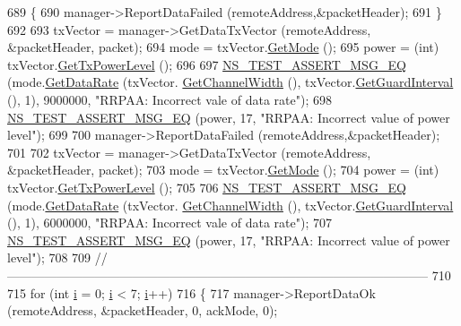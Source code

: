 \begin{DoxyCode}
689     \{
690       manager->ReportDataFailed (remoteAddress,&packetHeader);
691     \}
692 
693   txVector = manager->GetDataTxVector (remoteAddress, &packetHeader, packet);
694   mode = txVector.\hyperlink{classns3_1_1WifiTxVector_a497b1f11cad4b8b26251dfa07c9ad1d6}{GetMode} ();
695   power = (int) txVector.\hyperlink{classns3_1_1WifiTxVector_a7c98bd9609ff1c5cefa6e22d6908a2fe}{GetTxPowerLevel} ();
696 
697   \hyperlink{group__testing_ga2a9d78cffb3db8e867c35fff0b698cf5}{NS\_TEST\_ASSERT\_MSG\_EQ} (mode.\hyperlink{classns3_1_1WifiMode_adcfbe150f69da720db23387f733b8a52}{GetDataRate} (txVector.
      \hyperlink{classns3_1_1WifiTxVector_a1f8bfa51778a3e217581eb665f059564}{GetChannelWidth} (), txVector.\hyperlink{classns3_1_1WifiTxVector_ab80c0fd812542ef337a6cace4f64db63}{GetGuardInterval} (), 1), 9000000, \textcolor{stringliteral}{"RRPAA:
       Incorrect vale of data rate"});
698   \hyperlink{group__testing_ga2a9d78cffb3db8e867c35fff0b698cf5}{NS\_TEST\_ASSERT\_MSG\_EQ} (power, 17, \textcolor{stringliteral}{"RRPAA: Incorrect value of power level"});
699 
700   manager->ReportDataFailed (remoteAddress,&packetHeader);
701 
702   txVector = manager->GetDataTxVector (remoteAddress, &packetHeader, packet);
703   mode = txVector.\hyperlink{classns3_1_1WifiTxVector_a497b1f11cad4b8b26251dfa07c9ad1d6}{GetMode} ();
704   power = (int) txVector.\hyperlink{classns3_1_1WifiTxVector_a7c98bd9609ff1c5cefa6e22d6908a2fe}{GetTxPowerLevel} ();
705 
706   \hyperlink{group__testing_ga2a9d78cffb3db8e867c35fff0b698cf5}{NS\_TEST\_ASSERT\_MSG\_EQ} (mode.\hyperlink{classns3_1_1WifiMode_adcfbe150f69da720db23387f733b8a52}{GetDataRate} (txVector.
      \hyperlink{classns3_1_1WifiTxVector_a1f8bfa51778a3e217581eb665f059564}{GetChannelWidth} (), txVector.\hyperlink{classns3_1_1WifiTxVector_ab80c0fd812542ef337a6cace4f64db63}{GetGuardInterval} (), 1), 6000000, \textcolor{stringliteral}{"RRPAA:
       Incorrect vale of data rate"});
707   \hyperlink{group__testing_ga2a9d78cffb3db8e867c35fff0b698cf5}{NS\_TEST\_ASSERT\_MSG\_EQ} (power, 17, \textcolor{stringliteral}{"RRPAA: Incorrect value of power level"});
708 
709   \textcolor{comment}{//-----------------------------------------------------------------------------------------------------}
710 
715   \textcolor{keywordflow}{for} (\textcolor{keywordtype}{int} \hyperlink{bernuolliDistribution_8m_a6f6ccfcf58b31cb6412107d9d5281426}{i} = 0; \hyperlink{bernuolliDistribution_8m_a6f6ccfcf58b31cb6412107d9d5281426}{i} < 7; \hyperlink{bernuolliDistribution_8m_a6f6ccfcf58b31cb6412107d9d5281426}{i}++)
716     \{
717       manager->ReportDataOk (remoteAddress, &packetHeader, 0, ackMode, 0);

\end{DoxyCode}
